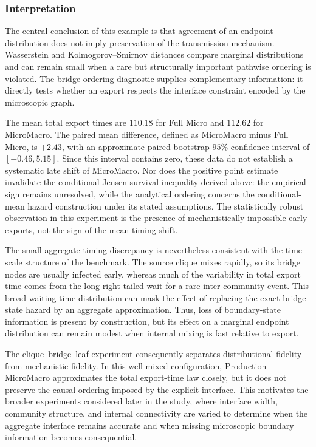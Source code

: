 \documentclass[a4paper,fleqn]{cas-sc}
\begin{document}
\subsubsection{Interpretation}

The central conclusion of this example is that agreement of an endpoint distribution does not imply preservation of the transmission mechanism. Wasserstein and Kolmogorov--Smirnov distances compare marginal distributions and can remain small when a rare but structurally important pathwise ordering is violated. The bridge-ordering diagnostic supplies complementary information: it directly tests whether an export respects the interface constraint encoded by the microscopic graph.

The mean total export times are $110.18$ for Full Micro and $112.62$ for MicroMacro. The paired mean difference, defined as MicroMacro minus Full Micro, is $+2.43$, with an approximate paired-bootstrap $95\%$ confidence interval of $[-0.46,5.15]$. Since this interval contains zero, these data do not establish a systematic late shift of MicroMacro. Nor does the positive point estimate invalidate the conditional Jensen survival inequality derived above: the empirical sign remains unresolved, while the analytical ordering concerns the conditional-mean hazard construction under its stated assumptions. The statistically robust observation in this experiment is the presence of mechanistically impossible early exports, not the sign of the mean timing shift.

The small aggregate timing discrepancy is nevertheless consistent with the time-scale structure of the benchmark. The source clique mixes rapidly, so its bridge nodes are usually infected early, whereas much of the variability in total export time comes from the long right-tailed wait for a rare inter-community event. This broad waiting-time distribution can mask the effect of replacing the exact bridge-state hazard by an aggregate approximation. Thus, loss of boundary-state information is present by construction, but its effect on a marginal endpoint distribution can remain modest when internal mixing is fast relative to export.

The clique--bridge--leaf experiment consequently separates distributional fidelity from mechanistic fidelity. In this well-mixed configuration, Production MicroMacro approximates the total export-time law closely, but it does not preserve the causal ordering imposed by the explicit interface. This motivates the broader experiments considered later in the study, where interface width, community structure, and internal connectivity are varied to determine when the aggregate interface remains accurate and when missing microscopic boundary information becomes consequential.
\end{document}
